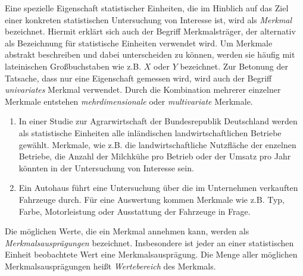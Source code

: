 \documentclass{lecture}
\begin{document}
    Eine spezielle Eigenschaft statistischer Einheiten, die im Hinblich auf das Ziel einer konkreten statistischen Untersuchung von Interesse ist, wird als \emph{Merkmal} bezeichnet.
    Hiermit erklärt sich auch der Begriff Merkmalsträger, der alternativ als Bezeichnung für statistische Einheiten verwendet wird.
    Um Merkmale abstrakt beschreiben und dabei unterscheiden zu können, werden sie häufig mit lateinischen Großbuchstaben wie z.B. \(X\) oder \(Y\) bezeichnet.
    Zur Betonung der Tatsache, dass nur eine Eigenschaft gemessen wird, wird auch der Begriff \emph{univariates} Merkmal verwendet.
    Durch die Kombination mehrerer einzelner Merkmale entstehen \emph{mehrdimensionale} oder \emph{multivariate} Merkmale.
    \begin{example}
        \begin{enumerate}
            \item In einer Studie zur Agrarwirtschaft der Bundesrepublik Deutschland werden als statistische Einheiten alle inländischen landwirtschaftlichen Betriebe gewählt.
            Merkmale, wie z.B. die landwirtschaftliche Nutzfläche der enzelnen Betriebe, die Anzahl der Milchkühe pro Betrieb oder der Umsatz pro Jahr könnten in der Untersuchung von Interesse sein.
            \item Ein Autohaus führt eine Untersuchung über die im Unternehmen verkauften Fahrzeuge durch.
            Für eine Auswertung kommen Merkmale wie z.B. Typ, Farbe, Motorleistung oder Ausstattung der Fahrzeuge in Frage.
        \end{enumerate}
    \end{example}
    Die möglichen Werte, die ein Merkmal annehmen kann, werden als \emph{Merkmalsausprägungen} bezeichnet.
    Insbesondere ist jeder an einer statistischen Einheit beobachtete Wert eine Merkmalsausprägung.
    Die Menge aller möglichen Merkmalsausprägungen heißt \emph{Wertebereich} des Merkmals.
\end{document}
